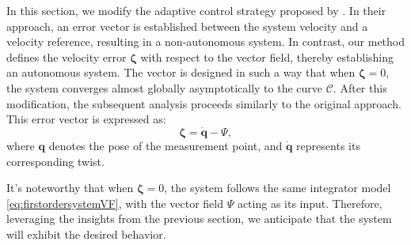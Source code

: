 In this section, we modify the adaptive control strategy proposed by \cite{Culbertson2021}. In their approach, an error vector is established between the system velocity and a velocity reference, resulting in a non-autonomous system. In contrast, our method defines the velocity error $\boldsymbol{\zeta}$ with respect to the vector field, thereby establishing an autonomous system. The vector is designed in such a way that when $\boldsymbol{\zeta}=0$, the system converges almost globally asymptotically to the curve $\mathcal{C}$. After this modification, the subsequent analysis proceeds similarly to the original approach. This error vector is expressed as:
\begin{equation}
    \boldsymbol{\zeta} = \dot{\mathbf{q}} - \Psi,\label{eq:errorvector-s}
\end{equation}
where $\mathbf{q}$ denotes the pose of the measurement point, and $\dot{\mathbf{q}}$ represents its corresponding twist.

It's noteworthy that when $\boldsymbol{\zeta}=0$, the system follows the same integrator model \eqref{eq:firstordersystemVF}, with the vector field $\Psi$ acting as its input. Therefore, leveraging the insights from the previous section, we anticipate that the system will exhibit the desired behavior.

